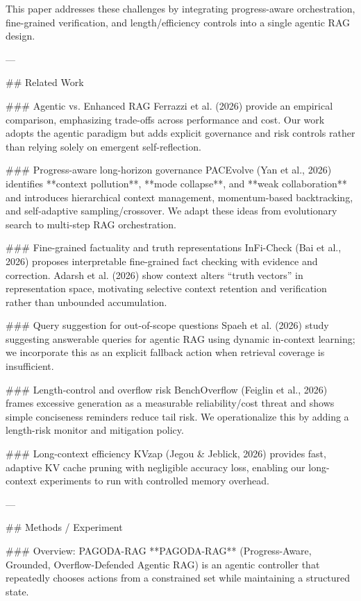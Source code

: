 This paper addresses these challenges by integrating progress-aware orchestration, fine-grained verification, and length/efficiency controls into a single agentic RAG design.

---

## Related Work  

### Agentic vs. Enhanced RAG  
Ferrazzi et al. (2026) provide an empirical comparison, emphasizing trade-offs across performance and cost. Our work adopts the agentic paradigm but adds explicit governance and risk controls rather than relying solely on emergent self-reflection.

### Progress-aware long-horizon governance  
PACEvolve (Yan et al., 2026) identifies **context pollution**, **mode collapse**, and **weak collaboration** and introduces hierarchical context management, momentum-based backtracking, and self-adaptive sampling/crossover. We adapt these ideas from evolutionary search to multi-step RAG orchestration.

### Fine-grained factuality and truth representations  
InFi-Check (Bai et al., 2026) proposes interpretable fine-grained fact checking with evidence and correction. Adarsh et al. (2026) show context alters “truth vectors” in representation space, motivating selective context retention and verification rather than unbounded accumulation.

### Query suggestion for out-of-scope questions  
Spaeh et al. (2026) study suggesting answerable queries for agentic RAG using dynamic in-context learning; we incorporate this as an explicit fallback action when retrieval coverage is insufficient.

### Length-control and overflow risk  
BenchOverflow (Feiglin et al., 2026) frames excessive generation as a measurable reliability/cost threat and shows simple conciseness reminders reduce tail risk. We operationalize this by adding a length-risk monitor and mitigation policy.

### Long-context efficiency  
KVzap (Jegou & Jeblick, 2026) provides fast, adaptive KV cache pruning with negligible accuracy loss, enabling our long-context experiments to run with controlled memory overhead.

---

## Methods / Experiment  

### Overview: PAGODA-RAG  
**PAGODA-RAG** (Progress-Aware, Grounded, Overflow-Defended Agentic RAG) is an agentic controller that repeatedly chooses actions from a constrained set while maintaining a structured state.


